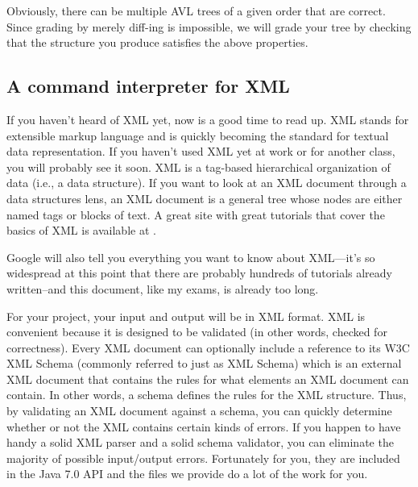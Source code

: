\documentclass[12pt]{article}
\begin{document}
Obviously, there can be multiple AVL trees of a given order that
are correct.
Since grading by merely diff-ing is impossible, we will 
grade your tree by checking that the structure you produce
satisfies the above properties.




\subsection{A command interpreter for XML}

If you haven't heard of XML yet, now is a good time to read up.  XML
stands for extensible markup language and is quickly becoming the
standard for textual data representation.  If you haven't used XML yet
at work or for another class, you will probably see it soon.  XML is a
tag-based hierarchical organization of data (i.e., a data structure).
If you want to look at an XML document through a data structures lens,
an XML document is a general tree whose nodes are either named tags or
blocks of text.  A great site with great tutorials that cover the
basics of XML is available at
.

Google will also tell you everything you want to know about XML---it's
so widespread at this point that there are probably hundreds of
tutorials already written--and this document, like my exams, is already too long.

For your project, your input and output will be in XML format.  XML is
convenient because it is designed to be validated (in other words,
checked for correctness).  Every XML document can optionally include a
reference to its W3C XML Schema (commonly referred to just as XML Schema) which is an
external XML document that contains the rules for what elements an XML
document can contain.  In other words, a schema defines the rules for the
XML structure.  Thus, by validating an XML document against a schema, you
can quickly determine whether or not the XML contains certain kinds of
errors.  If you happen to have handy a solid XML parser and a solid
schema validator, you can eliminate the majority of possible input/output
errors.  Fortunately for you, they are included in the Java 7.0 API and the files  we provide do a lot of the work for you.
\end{document}
